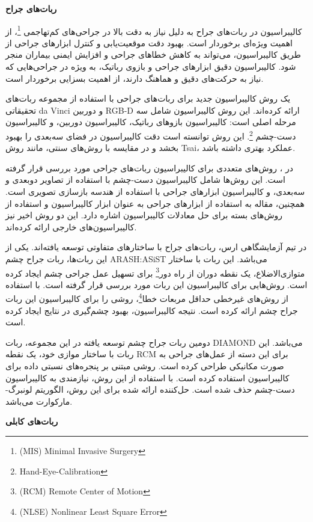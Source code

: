  
 \textbf {ربات‌های جراح}
 
 کالیبراسیون در ربات‌های جراح به دلیل نیاز به دقت بالا در جراحی‌های کم‌تهاجمی
 \footnote{(MIS) Minimal Invasive Surgery}،
 از اهمیت ویژه‌ای برخوردار است. بهبود دقت موقعیت‌یابی و کنترل ابزارهای جراحی از طریق کالیبراسیون، می‌تواند به کاهش خطاهای جراحی و افزایش ایمنی بیماران منجر شود. کالیبراسیون دقیق ابزارهای جراحی و بازوی رباتیک، به ویژه در جراحی‌هایی که نیاز به حرکت‌های دقیق و هماهنگ دارند، از اهمیت بسزایی برخوردار است.
 
\cite{roberti2020improving}
یک روش کالیبراسیون جدید برای ربات‌های جراحی با استفاده از مجموعه‌ ربات‌های تحقیقاتی da Vinci و دوربین RGB-D ارائه کرده‌اند. این روش کالیبراسیون شامل سه مرحله اصلی است: کالیبراسیون بازوهای رباتیک، کالیبراسیون دوربین، و کالیبراسیون دست-چشم
\footnote{Hand-Eye-Calibration}.
 این روش توانسته است دقت کالیبراسیون در فضای سه‌بعدی را بهبود بخشد و در مقایسه با روش‌های سنتی، مانند روش Tsai، عملکرد بهتری داشته باشد.
 
 در 
 \cite{wang2017vision}،
روش‌های متعددی برای کالیبراسیون ربات‌های جراحی مورد بررسی قرار گرفته است. این روش‌ها شامل کالیبراسیون دست-چشم با استفاده از تصاویر دوبعدی و سه‌بعدی، و کالیبراسیون ابزارهای جراحی با استفاده از هندسه بازسازی تصویری است. همچنین، مقاله به استفاده از ابزارهای جراحی به عنوان ابزار کالیبراسیون و استفاده از روش‌های بسته برای حل معادلات کالیبراسیون اشاره دارد. این دو روش اخیر نیز کالیبراسیون‌های خارجی ارائه کرده‌اند. 

در تیم آزمایشگاهی ارس، ربات‌های جراح با ساختارهای متفاوتی توسعه یافته‌اند. یکی از این ربات‌ها، ربات جراح چشم ARASH:ASiST می‌باشد. این ربات با ساختار متوازی‌الاضلاع، یک نقطه دوران از راه دور\footnote{(RCM) Remote Center of Motion} برای تسهیل عمل جراحی چشم ایجاد کرده است. روش‌هایی برای کالیبراسیون این ربات مورد بررسی قرار گرفته است. \cite{hassani2021kinematic} با استفاده از روش‌های غیرخطی حداقل مربعات خطا\footnote{(NLSE) Nonlinear Least Square Error}، روشی را برای کالیبراسیون این ربات جراح چشم ارائه کرده است. نتیجه کالیبراسیون، بهبود چشم‌گیری در نتایج ایجاد کرده است.

دومین ربات جراح چشم توسعه یافته در این مجموعه، ربات DIAMOND می‌باشد. این ربات با ساختار موازی خود، یک نقطه RCM برای این دسته از عمل‌های جراحی به صورت مکانیکی طراحی کرده است. \cite{dindarloo2023kinematic} روشی مبتنی بر پنجره‌های نسبتی داده برای کالیبراسیون استفاده کرده است. با استفاده از این روش، نیازمندی به کالیبراسیون دست-چشم حذف شده است. حل‌کننده ارائه شده برای این روش، الگوریتم لونبرگ-مارکوارت می‌باشد.

\textbf {ربات‌های کابلی}

